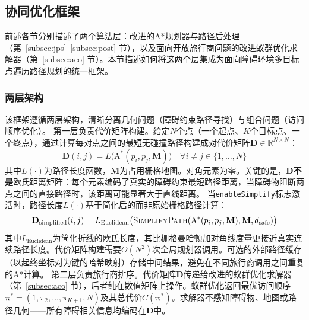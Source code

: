 \documentclass[lettersize,journal]{IEEEtran}
\begin{document}
\subsection{协同优化框架}
\label{subsec:coop}
前述各节分别描述了两个算法层：改进的A*规划器与路径后处理（第~\ref{subsec:jps}--\ref{subsec:post} 节），以及面向开放旅行商问题的改进蚁群优化求解器（第~\ref{subsec:aco} 节）。本节描述如何将这两个层集成为面向障碍环境多目标点遍历路径规划的统一框架。
\subsubsection{两层架构}
该框架遵循两层架构，清晰分离几何问题（障碍约束路径寻找）与组合问题（访问顺序优化）。
第一层负责代价矩阵构建。给定$N$个点（一个起点、$K$个目标点、一个终点），通过计算每对点之间的最短无碰撞路径构建成对代价矩阵$\mathbf{D} \in \mathbb{R}^{N \times N}$：
\begin{equation}
\mathbf{D}(i, j) = L\big(\mathrm{A}^{*}(p_i, p_j, \mathbf{M})\big) \quad \forall i \neq j \in \{1, \dots, N\}
\label{eq:dmatrix}
\end{equation}
其中$L(\cdot)$为路径长度函数，$\mathbf{M}$为占用栅格地图。对角元素为零。关键的是，$\mathbf{D}$\textbf{不是}欧氏距离矩阵：每个元素编码了真实的障碍约束最短路径距离，当障碍物阻断两点之间的直接路径时，该距离可能显著大于直线距离。
当\texttt{enableSimplify}标志激活时，路径长度$L(\cdot)$基于简化后的而非原始栅格路径计算：
\begin{equation}
\mathbf{D}_{\mathrm{simplified}}(i, j) = L_{\mathrm{Euclidean}}\big(\textsc{SimplifyPath}(\mathrm{A}^{*}(p_i, p_j, \mathbf{M}), \mathbf{M}, d_{\mathrm{safe}})\big)
\label{eq:dsimp}
\end{equation}
其中$L_{\mathrm{Euclidean}}$为简化折线的欧氏长度，其比栅格曼哈顿加对角线度量更接近真实连续路径长度。代价矩阵构建需要$O(N^2)$次全局规划器调用。可选的外部路径缓存（以起终坐标对为键的哈希映射）存储中间结果，避免在不同旅行商调用之间重复的A*计算。
第二层负责旅行商排序。代价矩阵$\mathbf{D}$传递给改进的蚁群优化求解器（第~\ref{subsec:aco} 节），后者纯在数值矩阵上操作。蚁群优化返回最优访问顺序$\bm{\pi}^{*} = (1, \pi_2, \dots, \pi_{K+1}, N)$及其总代价$C(\bm{\pi}^{*})$。求解器不感知障碍物、地图或路径几何——所有障碍相关信息均编码在$\mathbf{D}$中。
\end{document}
